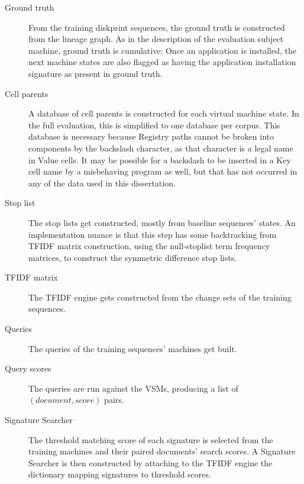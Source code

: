 \documentclass[11pt]{ucthesis}
\theoremstyle{plain}
\theoremstyle{definition}
\begin{document}
\begin{description}
\item[Ground truth] From the training diskprint sequences, the ground truth is constructed from the lineage graph.  As in the description of the evaluation subject machine, ground truth is cumulative: Once an application is installed, the next machine states are also flagged as having the application installation signature as present in ground truth.
\item[Cell parents] A database of cell parents is constructed for each virtual machine state.  In the full evaluation, this is simplified to one database per corpus.  This database is necessary because Registry paths cannot be broken into components by the backslash character, as that character is a legal name in Value cells.  It may be possible for a backslash to be inserted in a Key cell name by a misbehaving program as well, but that has not occurred in any of the data used in this dissertation.
\item[Stop list] The stop lists get constructed, mostly from baseline sequences' states.  An implementation nuance is that this step has some backtracking from TFIDF matrix construction, using the null-stoplist term frequency matrices, to construct the symmetric difference stop lists.
\item[TFIDF matrix] The TFIDF engine gets constructed from the change sets of the training sequences.
\item[Queries] The queries of the training sequences' machines get built.
\item[Query scores] The queries are run against the VSMs, producing a list of $(\mathit{document}, \mathit{score})$ pairs.
\item[Signature Searcher] The threshold matching score of each signature is selected from the training machines and their paired documents' search scores.  A Signature Searcher is then constructed by attaching to the TFIDF engine the dictionary mapping signatures to threshold scores.
\end{description}
\end{document}
